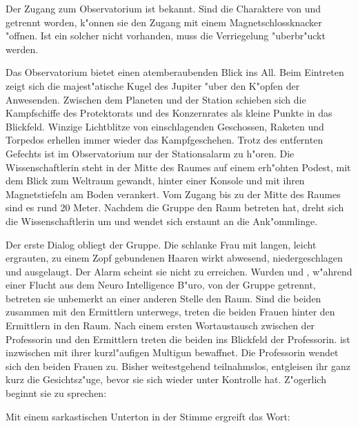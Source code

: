 
Der Zugang zum Observatorium ist \ml{} bekannt. Sind die Charaktere von \xl{} und \ml{} getrennt worden, k"onnen sie den Zugang mit einem Magnetschlossknacker "offnen. Ist ein solcher nicht vorhanden, muss die Verriegelung "uberbr"uckt werden.

Das Observatorium bietet einen atemberaubenden Blick ins All. Beim Eintreten zeigt sich die majest"atische Kugel des Jupiter "uber den K"opfen der Anwesenden. Zwischen dem Planeten und der Station schieben sich die Kampfschiffe des Protektorats und des Konzernrates als kleine Punkte in das Blickfeld. Winzige Lichtblitze von einschlagenden Geschossen, Raketen und Torpedos erhellen immer wieder das Kampfgeschehen. Trotz des entfernten Gefechts ist im Observatorium nur der Stationsalarm zu h"oren. Die Wissenschaftlerin steht in der Mitte des Raumes auf einem erh"ohten Podest, mit dem Blick zum Weltraum gewandt, hinter einer Konsole und mit ihren Magnetstiefeln am Boden verankert. Vom Zugang bis zu der Mitte des Raumes sind es rund 20 Meter. Nachdem die Gruppe den Raum betreten hat, dreht sich die Wissenschaftlerin um und wendet sich erstaunt an die Ank"ommlinge.


Der erste Dialog obliegt der Gruppe. Die schlanke Frau mit langen, leicht ergrauten, zu einem Zopf gebundenen Haaren wirkt abwesend, niedergeschlagen und ausgelaugt. Der Alarm scheint sie nicht zu erreichen. Wurden \xl{} und \ml{}, w"ahrend einer Flucht aus dem Neuro Intelligence B"uro, von der Gruppe getrennt, betreten sie unbemerkt an einer anderen Stelle den Raum. Sind die beiden zusammen mit den Ermittlern unterwegs, treten die beiden Frauen hinter den Ermittlern in den Raum. Nach einem ersten Wortaustausch zwischen der Professorin und den Ermittlern treten die beiden ins Blickfeld der Professorin. \xl{} ist inzwischen mit ihrer kurzl"aufigen Multigun bewaffnet. Die Professorin wendet sich den beiden Frauen zu. Bisher weitestgehend teilnahmslos, entgleisen ihr ganz kurz die Gesichtsz"uge, bevor sie sich wieder unter Kontrolle hat. Z"ogerlich beginnt sie zu sprechen:


Mit einem sarkastischen Unterton in der Stimme ergreift \xl{} das Wort:

